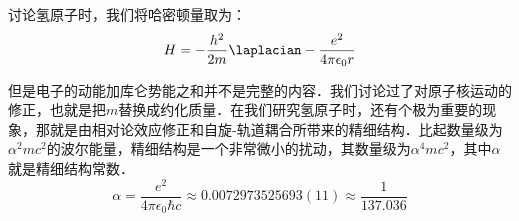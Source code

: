 
\begin{issues}
\issueDraft
\end{issues}
讨论氢原子时，我们将哈密顿量取为：\begin{equation}
H=-\frac{h^2}{2m}\laplacian-\frac{e^2}{4\pi\epsilon_0 r}
\end{equation}

但是电子的动能加库仑势能之和并不是完整的内容．我们讨论过了对原子核运动的修正，也就是把$m$替换成约化质量．在我们研究氢原子时，还有个极为重要的现象，那就是由相对论效应修正和自旋-轨道耦合所带来的精细结构．比起数量级为$\alpha^2 mc^2$的波尔能量，精细结构是一个非常微小的扰动，其数量级为$\alpha^4 mc^2$，其中$\alpha$就是精细结构常数．
\begin{equation}
\alpha = \frac{e^2}{4\pi\epsilon_0\hbar c} \approx 0.0072973525693(11) \approx \frac{1}{137.036}
\end{equation}

